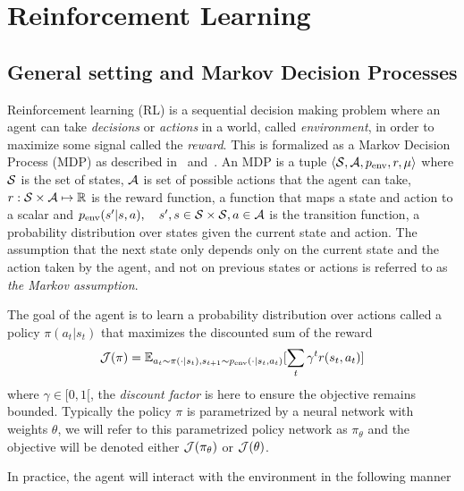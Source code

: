 
\section{Reinforcement Learning}
\label{sec:RL}
\subsection{General setting and Markov Decision Processes}

Reinforcement learning (RL) is a sequential decision making problem where an agent can take \textit{decisions} or \textit{actions} in a world, called \textit{environment}, in order to maximize some signal called the \textit{reward}. This is formalized as a Markov Decision Process (MDP) as described in~\citet{bellman1954theory} and~\citet{puterman2014markov}. An MDP is a tuple $\langle {\mathcal{S}}, {\mathcal{A}}, p_{\text{env}}, r, \mu\rangle$ where ${\mathcal{S}}$ is the set of states, ${\mathcal{A}}$ is set of possible actions that the agent can take, $r: {\mathcal{S}} \times {\mathcal{A}} \mapsto \mathbb{R}$ is the reward function, a function that maps a state and action to a scalar and $p_{\text{env}}(s' | s, a), \quad s', s \in {\mathcal{S}} \times {\mathcal{S}}, a \in {\mathcal{A}}$ is the transition function, a probability distribution over states given the current state and action. The assumption that the next state only depends only on the current state and the action taken by the agent, and not on previous states or actions is referred to as \emph{the Markov assumption}.

The goal of the agent is to learn a probability distribution over actions called a policy $\pi(a_t|s_t)$ that maximizes the discounted sum of the reward
$${\mathcal{J}}(\pi) = \mathbb{E}_{a_t \sim \pi(\cdot|s_t), s_{t+1} \sim p_{\text{env}}(\cdot | s_t, a_t)}[\sum_t \gamma^t r(s_t, a_t)]$$
where $\gamma \in [0, 1 [$, the \emph{discount factor} is here to ensure the objective remains bounded. Typically the policy $\pi$ is parametrized by a neural network with weights $\theta$, we will refer to this parametrized policy network as $\pi_\theta$ and the objective will be denoted either ${\mathcal{J}}(\pi_\theta)$ or ${\mathcal{J}}(\theta)$.

In practice, the agent will interact with the environment in the following manner

